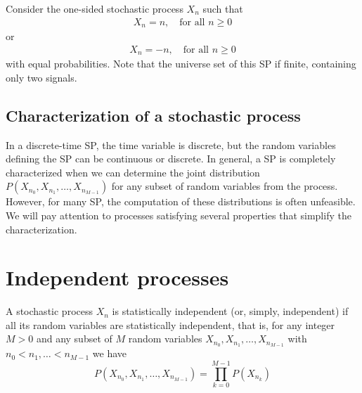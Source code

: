 \begin{example}
\label{ex:2signals}
Consider the one-sided stochastic process $X_n$ such that
\begin{align}
X_n = n, 	\quad		\text{for all } n \ge 0
\end{align}
or 
\begin{align}
X_n = -n, 	\quad		\text{for all } n \ge 0
\end{align}
with equal probabilities. Note that the universe set of this SP if finite, containing only two signals.

\end{example}


\subsection{Characterization of a stochastic process}

In a discrete-time SP, the time variable is discrete, but the random variables defining the SP can be continuous or discrete. In general, a SP is completely characterized when we can determine the joint distribution $P(X_{n_0},X_{n_1},\ldots, X_{n_{M-1}})$ for any subset of random variables from the process. However, for many SP, the computation of these distributions is often unfeasible. We will pay attention to processes satisfying several properties that simplify the characterization.


\section{Independent processes}

\begin{definition}
A stochastic process $X_n$ is statistically independent (or, simply, independent) if all its random variables are statistically independent, that is, for any integer $M >0$ and any subset of $M$ random variables $X_{n_0}, X_{n_1}, \ldots, X_{n_{M-1}}$ with $n_0<n_1,\ldots < n_{M-1}$ we have
\begin{equation}
\label{def_indep}
P(X_{n_0}, X_{n_1}, \ldots, X_{n_{M-1}}) = \prod_{k=0}^{M-1} P(X_{n_k})
\end{equation}
\end{definition}

